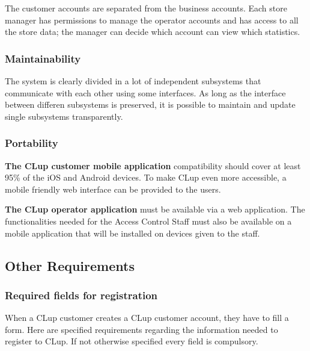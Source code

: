 The customer accounts are separated from the business accounts. Each store manager has permissions to manage the operator accounts and has access to all the store data; the manager can decide which account can view which statistics.
\subsubsection{Maintainability}
The system is clearly divided in a lot of independent subsystems that communicate with each other using some interfaces. As long as the interface between differen subsystems is preserved, it is possible to maintain and update single subsystems transparently.
\subsubsection{Portability}
\textbf{The CLup customer mobile application} compatibility should cover at least 95\% of the iOS and Android devices. To make CLup even more accessible, a mobile friendly web interface can be provided to the users.

\smallskip

\textbf{The CLup operator application} must be available via a web application. The functionalities needed for the Access Control Staff must also be available on a mobile application that will be installed on devices given to the staff.
\subsection{Other Requirements}
\subsubsection{Required fields for registration}
When a CLup customer creates a CLup customer account, they have to fill a form. Here are specified requirements regarding the information needed to register to CLup. If not otherwise specified every field is compulsory.

